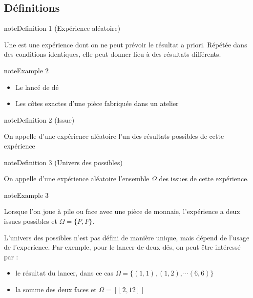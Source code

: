\documentclass[letterpaper,10pt,french]{sphinxmanual}
\begin{document}
\subsection{Définitions}
\label{\detokenize{Rappels:definitions}}\label{Rappels:expalea}
\begin{sphinxadmonition}{note}{Definition 1 (Expérience aléatoire)}



\sphinxAtStartPar
Une  est une expérience dont on ne peut prévoir le résultat a priori. Répétée dans des conditions identiques, elle peut donner lieu à des résultats différents.
\end{sphinxadmonition}
\label{Rappels:example-1}
\begin{sphinxadmonition}{note}{Example 2}


\begin{itemize}
\item {} 
\sphinxAtStartPar
Le lancé de dé

\item {} 
\sphinxAtStartPar
Les côtes exactes d’une pièce fabriquée dans un atelier

\end{itemize}
\end{sphinxadmonition}
\label{Rappels:issue}
\begin{sphinxadmonition}{note}{Definition 2 (Issue)}



\sphinxAtStartPar
On appelle  d’une expérience aléatoire l’un des résultats possibles de cette expérience
\end{sphinxadmonition}
\label{Rappels:univers}
\begin{sphinxadmonition}{note}{Definition 3 (Univers des possibles)}



\sphinxAtStartPar
On appelle  d’une expérience aléatoire l’ensemble  \(\Omega\) des issues de cette expérience.
\end{sphinxadmonition}
\label{Rappels:example-4}
\begin{sphinxadmonition}{note}{Example 3}



\sphinxAtStartPar
Lorsque l’on joue à pile ou face avec une pièce de monnaie, l’expérience a deux issues possibles et \(\Omega = \{P,F\}\).
\end{sphinxadmonition}

\sphinxAtStartPar
L’univers des possibles n’est pas défini de manière unique, mais dépend de l’usage de l’experience. Par exemple, pour le lancer de deux dés, on peut être intéressé par :
\begin{itemize}
\item {} 
\sphinxAtStartPar
le résultat du lancer, dans ce cas \(\Omega = \{(1,1), (1,2), \cdots (6,6)\}\)

\item {} 
\sphinxAtStartPar
la somme des deux faces et \(\Omega = [\![2,12]\!]\)

\end{itemize}
\end{document}
